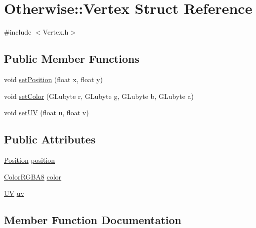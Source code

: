 \hypertarget{struct_otherwise_1_1_vertex}{}\section{Otherwise\+:\+:Vertex Struct Reference}
\label{struct_otherwise_1_1_vertex}


{\ttfamily \#include $<$Vertex.\+h$>$}

\subsection*{Public Member Functions}
\begin{DoxyCompactItemize}
\item 
void \hyperlink{struct_otherwise_1_1_vertex_a1a57c304714fee3ed7f582df61cb0654}{set\+Position} (float x, float y)
\item 
void \hyperlink{struct_otherwise_1_1_vertex_a4d361f431763fc4b61b39f02ebd84803}{set\+Color} (G\+Lubyte r, G\+Lubyte g, G\+Lubyte b, G\+Lubyte a)
\item 
void \hyperlink{struct_otherwise_1_1_vertex_a9d14fae629bb0b7536525d613ca22b4d}{set\+UV} (float u, float v)
\end{DoxyCompactItemize}
\subsection*{Public Attributes}
\begin{DoxyCompactItemize}
\item 
\hyperlink{struct_otherwise_1_1_position}{Position} \hyperlink{struct_otherwise_1_1_vertex_a95a1a79fa4ef68e871b6bd5f978d978b}{position}
\item 
\hyperlink{struct_otherwise_1_1_color_r_g_b_a8}{Color\+R\+G\+B\+A8} \hyperlink{struct_otherwise_1_1_vertex_a6af8f407d213eb5885c345b47de277d8}{color}
\item 
\hyperlink{struct_otherwise_1_1_u_v}{UV} \hyperlink{struct_otherwise_1_1_vertex_aa8d988fd971a54434b5952b3a2b44c5a}{uv}
\end{DoxyCompactItemize}


\subsection{Member Function Documentation}
\mbox{\label{struct_otherwise_1_1_vertex_a4d361f431763fc4b61b39f02ebd84803}} 
